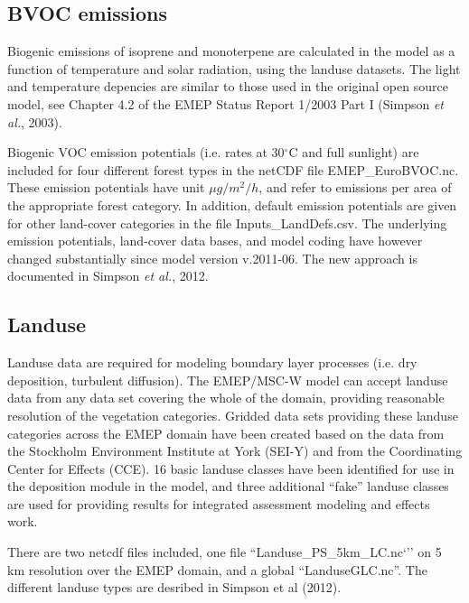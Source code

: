 \subsection{BVOC emissions}
Biogenic emissions of isoprene and monoterpene are calculated in the
model as a function of temperature and solar radiation, using the landuse
datasets. The light and temperature depencies are similar to those
used in the original open source model, see 
Chapter 4.2 of the EMEP Status Report 1/2003 Part I (Simpson
{\sl et al.}, 2003).

Biogenic VOC emission potentials (i.e. rates at 30$^\circ$C and full sunlight)
are included for four different forest types in the netCDF file 
EMEP\_EuroBVOC.nc. These emission potentials have unit $\mu g/m^{2} /h$, and
refer to emissions per area of the appropriate forest category. In 
addition, default emission potentials are given for other
land-cover categories in the file Inputs\_LandDefs.csv. 
The underlying emission potentials, land-cover data bases, and model
coding have however changed substantially since model version v.2011-06. The new approach
is documented in Simpson {\sl et al.}, 2012.

\subsection{Landuse}

Landuse data are required for modeling boundary layer processes
(i.e. dry deposition, turbulent diffusion).
The EMEP/MSC-W model can accept landuse data from any
data set covering the whole of the domain, providing reasonable 
resolution of the vegetation categories. Gridded data sets providing
these landuse categories across the EMEP domain have been created
based on the data from the Stockholm Environment Institute at York 
(SEI-Y) and from the Coordinating Center for Effects (CCE). 
16 basic landuse classes have been identified for use in the
deposition module in the model, and three additional ``fake'' landuse
classes are used for providing results for integrated assessment
modeling and effects work.

There are two netcdf files included, one file ``Landuse\_PS\_5km\_LC.nc`'' on 5 km resolution over the EMEP domain, and a global ``LanduseGLC.nc''. The different landuse types are desribed in Simpson et al (2012). 

% 

